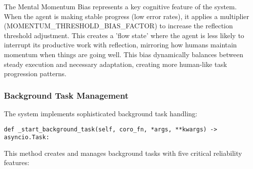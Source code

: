 \documentclass[12pt,a4paper]{article}
\begin{document}
The Mental Momentum Bias represents a key cognitive feature of the system. When the agent is making stable progress (low error rates), it applies a multiplier (MOMENTUM\_THRESHOLD\_BIAS\_FACTOR) to increase the reflection threshold adjustment. This creates a 'flow state' where the agent is less likely to interrupt its productive work with reflection, mirroring how humans maintain momentum when things are going well. This bias dynamically balances between steady execution and necessary adaptation, creating more human-like task progression patterns.

\subsubsection*{Background Task Management}

The system implements sophisticated background task handling:
\begin{pageablecode}
\begin{verbatim}
def _start_background_task(self, coro_fn, *args, **kwargs) -> asyncio.Task:
\end{verbatim}
\end{pageablecode}
This method creates and manages background tasks with five critical reliability features:
\end{document}
